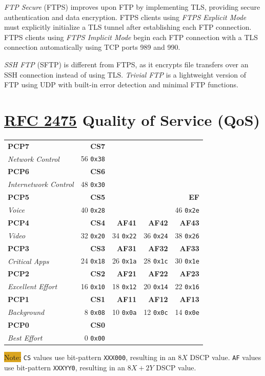 \documentclass[12pt]{article}
\newcommand{\note}[1]{\colorbox{#1}{Note:}}
\newcommand{\RFC}[1]{\href{https://datatracker.ietf.org/doc/html/rfc#1}{RFC #1}}
\begin{document}
	\textit{FTP Secure} (FTPS) improves upon FTP by implementing TLS, providing secure authentication and data encryption. FTPS clients using \textit{FTPS Explicit Mode} must explicitly initialize a TLS tunnel after establishing each FTP connection. FTPS clients using \textit{FTPS Implicit Mode} begin each FTP connection with a TLS connection automatically using TCP ports 989 and 990.

	\textit{SSH FTP} (SFTP) is different from FTPS, as it encrypts file transfers over an SSH connection instead of using TLS. \textit{Trivial FTP} is a lightweight version of FTP using UDP with built-in error detection and minimal FTP functions.





\section{\RFC{2475} Quality of Service (QoS) \label{sec:QOS}}
	\begin{table}[H]
	\centering
	\begin{tabular}{ l r r r r }
	\textbf{PCP7}			& \textbf{CS7}	&			&			&\\
	\textit{Network Control}	& 56 \texttt{0x38}	&			&			&\\
	\textbf{PCP6}			& \textbf{CS6}	&			&			&\\
	\textit{Internetwork Control}	& 48 \texttt{0x30}	&			&			&\\
	\textbf{PCP5}			& \textbf{CS5}	&			&			& \textbf{EF}\\
	\textit{Voice}			& 40 \texttt{0x28}	&			&			& 46 \texttt{0x2e}\\
	\textbf{PCP4}			& \textbf{CS4}	& \textbf{AF41}	& \textbf{AF42}	& \textbf{AF43}\\
	\textit{Video}			& 32 \texttt{0x20} & 34 \texttt{0x22} & 36 \texttt{0x24} & 38 \texttt{0x26}\\
	\textbf{PCP3}			& \textbf{CS3}	& \textbf{AF31}	& \textbf{AF32}	& \textbf{AF33}\\
	\textit{Critical Apps}		& 24 \texttt{0x18} & 26 \texttt{0x1a} & 28 \texttt{0x1c} & 30 \texttt{0x1e}\\
	\textbf{PCP2}			& \textbf{CS2}	& \textbf{AF21}	& \textbf{AF22}	& \textbf{AF23}\\
	\textit{Excellent Effort}		& 16 \texttt{0x10} & 18 \texttt{0x12} & 20 \texttt{0x14} & 22 \texttt{0x16}\\
	\textbf{PCP1}			& \textbf{CS1}	& \textbf{AF11}	& \textbf{AF12}	& \textbf{AF13}\\
	\textit{Background}		& 8 \texttt{0x08} & 10 \texttt{0x0a} & 12 \texttt{0x0c} & 14 \texttt{0x0e}\\
	\textbf{PCP0}			& \textbf{CS0}	&			&			&\\
	\textit{Best Effort}			& 0 \texttt{0x00} &			&			&\\
	\end{tabular}
	\end{table}
	\note{Goldenrod} \texttt{CS} values use bit-pattern \texttt{XXX000}, resulting in an $8X$ DSCP value. \texttt{AF} values use bit-pattern \texttt{XXXYY0}, resulting in an $8X+2Y$ DSCP value.
\end{document}

